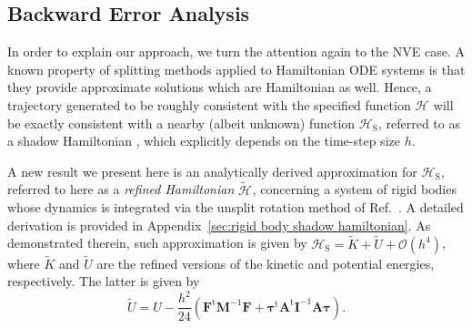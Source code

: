 \documentclass[
	aip,
	jcp,
	reprint,
]{revtex4-1}
\newcommand{\mt}[1]{\boldsymbol{\mathbf{#1}}}          %
\newcommand{\vt}[1]{\boldsymbol{\mathbf{#1}}}          %
\newcommand{\tr}[1]{#1^\text{t}}                       %
\newcommand{\Ham}[1]{{\mathcal H}_\text{#1}}           %
\newcommand{\timestep}{h}
\newcommand{\refined}[1]{\widetilde{#1}}
\begin{document}
\subsection{Backward Error Analysis}
\label{sec:backward error analysis}

In order to explain our approach, we turn the attention again to the NVE case.
A known property of splitting methods applied to Hamiltonian ODE systems is that they provide approximate solutions which are Hamiltonian as well.
Hence, a trajectory generated to be roughly consistent with the specified function $\Ham{}$ will be exactly consistent with a nearby (albeit unknown) function $\Ham{S}$, referred to as a shadow Hamiltonian \cite{Hairer_2006}, which explicitly depends on the time-step size $\timestep$.

A new result we present here is an analytically derived approximation for $\Ham{S}$, referred to here as a \textit{refined Hamiltonian} $\refined{\Ham{}}$, concerning a system of rigid bodies whose dynamics is integrated via the unsplit rotation method of Ref.~.
A detailed derivation is provided in Appendix~\ref{sec:rigid body shadow hamiltonian}.
As demonstrated therein, such approximation is given by $\Ham{S} = \refined K + \refined U + \mathcal{O}(\timestep^4)$, where $\refined K$ and $\refined U$ are the refined versions of the kinetic and potential energies, respectively.
The latter is given by
\begin{equation}
\label{eq:modified potential energy}
\refined U = U - \frac{\timestep^2}{24} \left( \tr{\vt F} {\mt M}^{-1} {\vt F} + \tr{\vt \tau} \tr{\mt A} {\mt I}^{-1} {\mt A} {\vt \tau} \right).
\end{equation}
\end{document}

